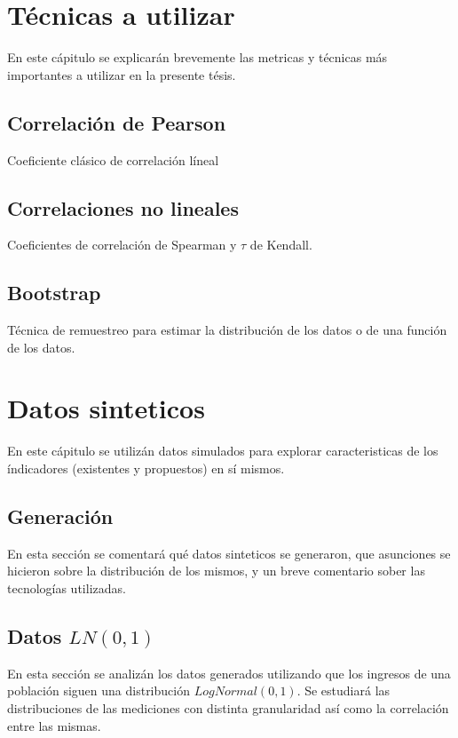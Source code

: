 \documentclass[11pt,a4paper]{tesis}
\begin{document}
\chapter{Técnicas a utilizar}

En este cápitulo se explicarán brevemente las metricas y técnicas más importantes a utilizar en la presente tésis.

\section{Correlación de Pearson}

Coeficiente clásico de correlación líneal

\section{Correlaciones no lineales}

Coeficientes de correlación de Spearman y $\tau$ de Kendall.

\section{Bootstrap}

Técnica de remuestreo para estimar la distribución de los datos o de una función de los datos.

\chapter{Datos sinteticos}

En este cápitulo se utilizán datos simulados para explorar caracteristicas de los índicadores (existentes y propuestos) en sí mismos.

\section{Generación}
En esta sección se comentará qué datos sinteticos se generaron, que asunciones se hicieron sobre la distribución de los mismos, y un breve comentario sober las tecnologías utilizadas.

\section{Datos $LN(0,1)$}

En esta sección se analizán los datos generados utilizando que los ingresos de una población siguen una distribución $LogNormal(0,1)$. Se estudiará las distribuciones de las mediciones con distinta granularidad así como la correlación entre las mismas.
\end{document}

